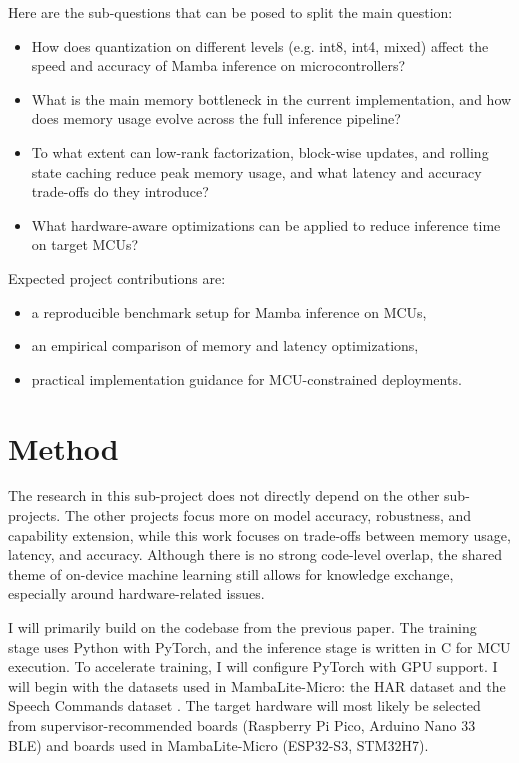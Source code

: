 \documentclass[english, a4paper]{article}
\begin{document}
Here are the sub-questions that can be posed to split the main question:
\begin{itemize}
    \item How does quantization on different levels (e.g. int8, int4, mixed) affect the speed and accuracy of Mamba inference on microcontrollers?
    \item What is the main memory bottleneck in the current implementation, and how does memory usage evolve across the full inference pipeline?
    \item To what extent can low-rank factorization, block-wise updates, and rolling state caching reduce peak memory usage, and what latency and accuracy trade-offs do they introduce?
    \item What hardware-aware optimizations can be applied to reduce inference time on target MCUs?
\end{itemize}

Expected project contributions are:
\begin{itemize}
    \item a reproducible benchmark setup for Mamba inference on MCUs,
    \item an empirical comparison of memory and latency optimizations,
    \item practical implementation guidance for MCU-constrained deployments.
\end{itemize}

\section*{Method}

The research in this sub-project does not directly depend on the other sub-projects. The other projects focus more on model accuracy, robustness, and capability extension, while this work focuses on trade-offs between memory usage, latency, and accuracy. Although there is no strong code-level overlap, the shared theme of on-device machine learning still allows for knowledge exchange, especially around hardware-related issues.

I will primarily build on the codebase from the previous paper. The training stage uses Python with PyTorch, and the inference stage is written in C for MCU execution. To accelerate training, I will configure PyTorch with GPU support. I will begin with the datasets used in MambaLite-Micro: the HAR dataset \cite{human_activity_recognition_using_smartphones_240} and the Speech Commands dataset \cite{warden2018speechcommandsdatasetlimitedvocabulary}. The target hardware will most likely be selected from supervisor-recommended boards (Raspberry Pi Pico, Arduino Nano 33 BLE) and boards used in MambaLite-Micro (ESP32-S3, STM32H7).
\end{document}
